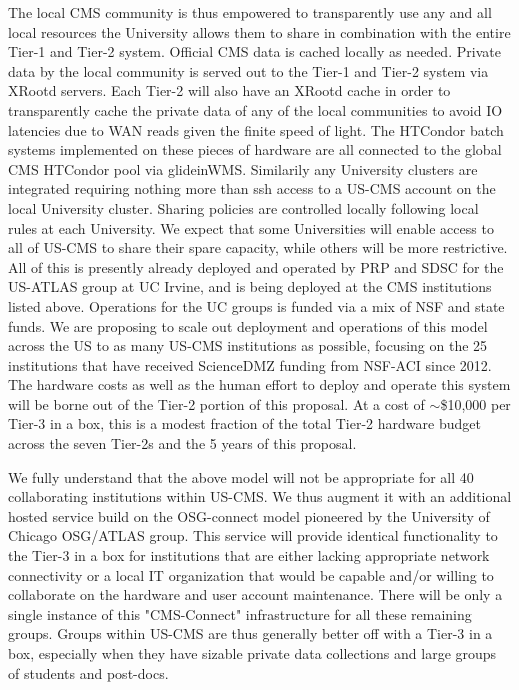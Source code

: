 The local CMS community is thus empowered to transparently use any and all local resources the University allows them to share in
combination with the entire Tier-1 and Tier-2 system. Official CMS data is cached locally as needed. Private data by the local community is served out to the Tier-1 and Tier-2 system via XRootd servers. Each Tier-2 will also have an XRootd cache in order to transparently
cache the private data of any of the local communities to avoid IO latencies due to WAN reads given the finite speed of light.
The HTCondor batch systems implemented on these pieces of hardware are all connected to the global CMS HTCondor pool via
glideinWMS. Similarily any University clusters are integrated requiring nothing more than ssh access to a US-CMS account on the
local University cluster. Sharing policies are controlled locally following local rules at each University. We expect that some Universities
will enable access to all of US-CMS to share their spare capacity, while others will be more restrictive. All of this is presently
already deployed and operated by PRP and SDSC for the US-ATLAS group at UC Irvine, and is being deployed at the CMS institutions listed above. Operations for the UC groups is funded via a mix of NSF and state funds. We are proposing to scale out deployment and operations of this model across the US to as many US-CMS institutions as possible, focusing on the 25 institutions that have received ScienceDMZ funding
from NSF-ACI since 2012. The hardware costs as well as the human effort to deploy and operate this system 
will be borne out of the Tier-2 portion of this proposal. At a cost of $\sim$\$10,000 per Tier-3 in a box, this is a modest fraction of the total
Tier-2 hardware budget across the seven Tier-2s and the 5 years of this proposal.

We fully understand that the above model will not be appropriate for all 40 collaborating institutions within US-CMS. We thus augment 
it with an additional hosted service build on the OSG-connect model pioneered by the University of Chicago OSG/ATLAS group.
This service will provide identical functionality to the Tier-3 in a box for institutions that are either lacking appropriate network connectivity
or a local IT organization that would be capable and/or willing to collaborate on the hardware and user account maintenance.
There will be only a single instance of this "CMS-Connect" infrastructure for all these remaining groups. Groups within US-CMS are thus generally better off with a Tier-3 in a box, especially when they have sizable private data collections and large groups of students and post-docs.

